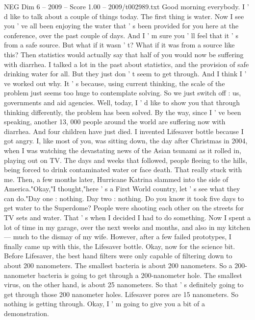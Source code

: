 \begin{textsample}{NEG Dim 6 – 2009 – Score 1.00 – 2009/t002989.txt}  \label{ex:f6_neg_049}
Good morning everybody.
I ' d like to talk about a couple of things today.
The first thing is water.
Now I see you ' ve all been enjoying the water that ' s been provided for you here at the conference, over the past couple of days.
And I ' m sure you ' ll feel that it ' s from a safe source.
But what if it wasn ' t?
What if it was from a source like this?
Then statistics would actually say that half of you would now be suffering with diarrhea.
I talked a lot in the past about statistics, and the provision of safe drinking water for all.
But they just don ' t seem to get through.
And I think I ' ve worked out why.
It ' s because, using current thinking, the scale of the problem just seems too huge to contemplate solving.
So we just switch off : us, governments and aid agencies.
Well, today, I ' d like to show you that through thinking differently, the problem has been solved.
By the way, since I ' ve been speaking, another 13, 000 people around the world are suffering now with diarrhea.
And four children have just died.
I invented Lifesaver bottle because I got angry.
I, like most of you, was sitting down, the day after Christmas in 2004, when I was watching the devastating news of the Asian tsunami as it rolled in, playing out on TV.
The days and weeks that followed, people fleeing to the hills, being forced to drink contaminated water or face death.
That really stuck with me.
Then, a few months later, Hurricane Katrina slammed into the side of America."Okay,"I thought,"here ' s a First World country, let ' s see what they can do."Day one : nothing.
Day two : nothing.
Do you know it took five days to get water to the Superdome?
People were shooting each other on the streets for TV sets and water.
That ' s when I decided I had to do something.
Now I spent a lot of time in my garage, over the next weeks and months, and also in my kitchen — much to the dismay of my wife.
However, after a few failed prototypes, I finally came up with this, the Lifesaver bottle.
Okay, now for the science bit.
Before Lifesaver, the best hand filters were only capable of filtering down to about 200 nanometers.
The smallest bacteria is about 200 nanometers.
So a 200-nanometer bacteria is going to get through a 200-nanometer hole.
The smallest virus, on the other hand, is about 25 nanometers.
So that ' s definitely going to get through those 200 nanometer holes.
Lifesaver pores are 15 nanometers.
So nothing is getting through.
Okay, I ' m going to give you a bit of a demonstration.

\end{textsample}
